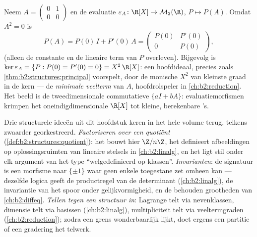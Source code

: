 \begin{example}\label{ex:b2:structures:evaluation}
Neem $A = \begin{pmatrix}0 & 1\\ 0 & 0\end{pmatrix}$ en de
evaluatie $\varepsilon_A \colon \R[X] \to \mathcal{M}_2(\R)$, $P
\mapsto P(A)$. Omdat $A^2 = 0$ is
\[
P(A) = P(0)\,I + P'(0)\,A =
\begin{pmatrix} P(0) & P'(0)\\ 0 & P(0)\end{pmatrix},
\]
(alleen de constante en de lineaire term van $P$ overleven).
Bijgevolg is $\ker\varepsilon_A = \{P : P(0) = P'(0) = 0\} =
X^2\,\R[X]$: een hoofdideaal, precies zoals
\cref{thm:b2:structures:principal} voorspelt,  door
de monische $X^2$ van kleinste graad in de kern --- de
\emph{minimale veelterm} van $A$, hoofdrolspeler in
\cref{ch:b2:reduction}. Het beeld is de tweedimensionale
commutatieve  $\{aI + bA\}$: evaluatiemorfismen krimpen het
oneindigdimensionale $\R[X]$ tot kleine, berekenbare 's.
\end{example}

\begin{remark}\label{rem:b2:structures:perspectives}
Drie structurele ideeën uit dit hoofdstuk keren in het hele
volume terug, telkens zwaarder georkestreerd. \emph{Factoriseren
over een quotiënt} (\cref{def:b2:structures:quotient}): het bouwt
hier $\Z/n\Z$, het definieert afbeeldingen op oplossingsruimten
van lineaire stelsels in \cref{ch:b2:linalg}, en het ligt stil
onder elk argument van het type ``welgedefinieerd op klassen''.
\emph{Invarianten}: de signatuur is een morfisme naar $\{\pm1\}$
waar geen enkele toegestane zet omheen kan --- dezelfde logica
geeft de productregel van de determinant
(\cref{ch:b2:linalg}), de invariantie van het spoor onder
gelijkvormigheid, en de behouden grootheden van
\cref{ch:b2:diffeq}. \emph{Tellen tegen een structuur in}:
Lagrange telt via nevenklassen, dimensie telt via basissen
(\cref{ch:b2:linalg}), multipliciteit telt via veeltermgraden
(\cref{ch:b2:reduction}); zodra een grens wonderbaarlijk lijkt,
doet ergens een partitie of een gradering het telwerk.
\end{remark}

